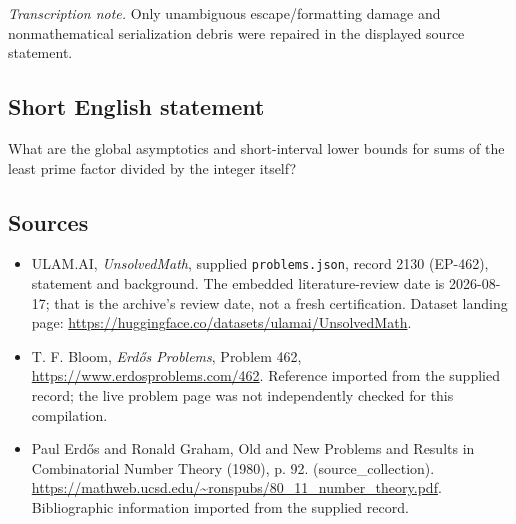 \documentclass[11pt,a4paper]{article}
\begin{document}
{\small\emph{Transcription note.} Only unambiguous escape/formatting damage and nonmathematical serialization debris were repaired in the displayed source statement.}

\subsection{Short English statement}

What are the global asymptotics and short-interval lower bounds for sums of the least prime factor divided by the integer itself?

\subsection{Sources}

{\small

\begin{itemize}

\item[\hypertarget{source:2130:1}{S1}] ULAM.AI, \emph{UnsolvedMath}, supplied \texttt{problems.json}, record 2130 (EP-462), statement and background. The embedded literature-review date is 2026-08-17; that is the archive’s review date, not a fresh certification. Dataset landing page: \url{https://huggingface.co/datasets/ulamai/UnsolvedMath}.

\item[\hypertarget{source:2130:2}{S2}] T. F. Bloom, \emph{Erdős Problems}, Problem 462, \url{https://www.erdosproblems.com/462}. Reference imported from the supplied record; the live problem page was not independently checked for this compilation.

\item[\hypertarget{source:2130:3}{S3}] Paul Erdős and Ronald Graham, Old and New Problems and Results in Combinatorial Number Theory (1980), p. 92. (source\_collection). \url{https://mathweb.ucsd.edu/~ronspubs/80_11_number_theory.pdf}. Bibliographic information imported from the supplied record.

\end{itemize}

}

\label{end:2130}
\end{document}
